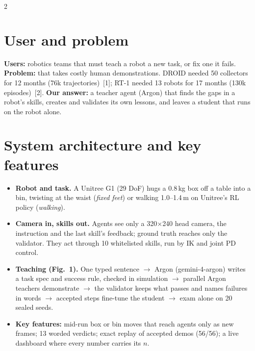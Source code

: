 \documentclass[9pt]{extarticle}
\newcommand{\head}[1]{\textbf{#1}\hspace{0.3em}}
\begin{document}
\vspace{2pt}
\raggedcolumns
\begin{multicols}{2}

\section{User and problem}
\head{Users:} robotics teams that must teach a robot a new task, or fix one it fails. \head{Problem:} that takes costly human demonstrations. DROID needed 50 collectors for 12 months (76k trajectories)~[1]; RT-1 needed 13 robots for 17 months (130k episodes)~[2]. \head{Our answer:} a teacher agent (Argon) that finds the gaps in a robot's skills, creates and validates its own lessons, and leaves a student that runs on the robot alone.

\section{System architecture and key features}
\begin{itemize}
\item \head{Robot and task.} A Unitree G1 (29 DoF) hugs a 0.8\,kg box off a table into a bin, twisting at the waist (\textit{fixed feet}) or walking 1.0--1.4\,m on Unitree's RL policy (\textit{walking}).
\item \head{Camera in, skills out.} Agents see only a 320$\times$240 head camera, the instruction and the last skill's feedback; ground truth reaches only the validator. They act through 10 whitelisted skills, run by IK and joint PD control.
\item \head{Teaching (Fig.~1).} One typed sentence $\rightarrow$ Argon (gemini-4-argon) writes a task spec and success rule, checked in simulation $\rightarrow$ parallel Argon teachers demonstrate $\rightarrow$ the validator keeps what passes and names failures in words $\rightarrow$ accepted steps fine-tune the student $\rightarrow$ exam alone on 20 sealed seeds.
\item \head{Key features:} mid-run box or bin moves that reach agents only as new frames; 13 worded verdicts; exact replay of accepted demos (56/56); a live dashboard where every number carries its $n$.
\end{itemize}


\end{multicols}
\end{document}
